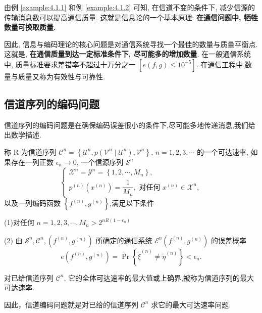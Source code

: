 由例 \ref{example:4.1.1} 和例 \ref{example:4.1.2} 可知, 在信道不变的条件下, 减少信源的传输消息数可以提高通信质量. 这就是信息论的一个基本原理: \textbf{在通信问题中, 牺牲数量可换取质量.}

因此, 信息与编码理论的核心问题是对通信系统寻找一个最佳的数量与质量平衡点. 这就是, \textbf{在通信质量到达一定标准条件下, 尽可能多的增加数量}. 在一般通信系统中, 质量标准要求差错率不超过十万分之一 $ \left[e(f, g) \leqslant 10^{-5}\right] $. 在通信工程中,数量与质量又称为有效性与可靠性.



\subsection{信道序列的编码问题}

信道序列的编码问题是在确保编码误差很小的条件下,尽可能多地传递消息,我们给出数学描述.
\begin{definition}
     称 $ \mathrm{R} $ 为信道序列 $ \mathscr{C}^{n}=\left\{\mathscr{U}^{n}, p\left(\mathscr{V}^{n} \mid \mathscr{U}^{n}\right), \mathscr{V}^{n}\right\} $, $ n=1,2,3, \cdots $ 的一个可达速率, 如果存在一列正数 $ \epsilon_{n} \rightarrow 0 $, 一个信源序列 $ \mathscr{S}^{n} $
$$
\left\{\begin{array}{l}
\mathscr{X}^{n}=\mathscr{Y}^{n}=\left\{1,2, \cdots, M_{n}\right\}, \\
p^{(n)}\left(x^{(n)}\right)=\dfrac{1}{M_{n}}, \text { 对任何 } x^{(n)} \in \mathscr{X}^{n},
\end{array}\right.
$$
以及一列编码函数 $ \left\{f^{(n)}, g^{(n)}\right\} $,满足以下条件

(1)对任何 $ n=1,2,3, \cdots, M_{n}>2^{n R\left(1-\epsilon_{n}\right)} $

(2) 由 $ \mathscr{S}^{n}, \mathscr{C}^{n},\left(f^{(n)}, g^{(n)}\right) $ 所确定的通信系统 $ \mathscr{E}^{n}\left(f^{(n)}, g^{(n)}\right) $ 的误差概率
$$
e\left(f^{(n)}, g^{(n)}\right)=\operatorname{Pr}\left\{\widetilde{\xi}^{(n)} \neq \widetilde{\eta}^{(n)}\right\}<\epsilon_{n} .
$$
\end{definition}

\begin{definition}
对已给信道序列 $ \mathscr{C}^{n} $, 它的全体可达速率的最大值或上确界,被称为信道序列的最大可达速率.
\end{definition}

因此，信道编码问题就是对已给的信道序列 $ \mathscr{C}^{n} $ 求它的最大可达速率问题.

